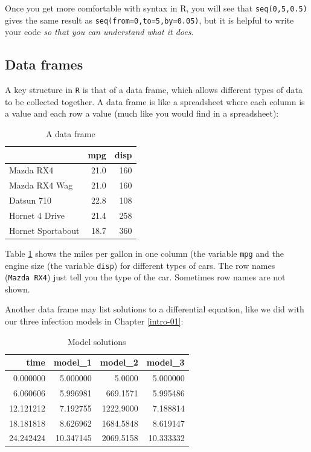 \documentclass[
]{book}
\theoremstyle{definition}
\theoremstyle{definition}
\theoremstyle{definition}
\theoremstyle{remark}
\begin{document}
Once you get more comfortable with syntax in R, you will see that \texttt{seq(0,5,0.5)} gives the same result as \texttt{seq(from=0,to=5,by=0.05)}, but it is helpful to write your code \emph{so that you can understand what it does}.

\hypertarget{data-frames}{%
\subsection{Data frames}\label{data-frames}}

A key structure in \texttt{R} is that of a data frame, which allows different types of data to be collected together. A data frame is like a spreadsheet where each column is a value and each row a value (much like you would find in a spreadsheet):

\begin{table}

\caption{\label{tab:sample-data}A data frame}
\centering
\begin{tabular}[t]{l|r|r}
\hline
  & mpg & disp\\
\hline
Mazda RX4 & 21.0 & 160\\
\hline
Mazda RX4 Wag & 21.0 & 160\\
\hline
Datsun 710 & 22.8 & 108\\
\hline
Hornet 4 Drive & 21.4 & 258\\
\hline
Hornet Sportabout & 18.7 & 360\\
\hline
\end{tabular}
\end{table}

Table \ref{tab:sample-data} shows the miles per gallon in one column (the variable \texttt{mpg} and the engine size (the variable \texttt{disp}) for different types of cars. The row names (\texttt{Mazda\ RX4}) just tell you the type of the car. Sometimes row names are not shown.

Another data frame may list solutions to a differential equation, like we did with our three infection models in Chapter \ref{intro-01}:

\begin{table}

\caption{\label{tab:model-table}Model solutions}
\centering
\begin{tabular}[t]{r|r|r|r}
\hline
time & model\_1 & model\_2 & model\_3\\
\hline
0.000000 & 5.000000 & 5.0000 & 5.000000\\
\hline
6.060606 & 5.996981 & 669.1571 & 5.995486\\
\hline
12.121212 & 7.192755 & 1222.9000 & 7.188814\\
\hline
18.181818 & 8.626962 & 1684.5848 & 8.619147\\
\hline
24.242424 & 10.347145 & 2069.5158 & 10.333332\\
\hline
\end{tabular}
\end{table}
\end{document}
